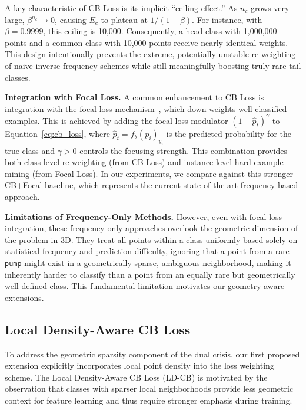 \documentclass[preprint,12pt]{elsarticle}
\begin{document}
A key characteristic of CB Loss is its implicit ``ceiling effect.'' As \(n_c\) grows very large, \(\beta^{n_c} \to 0\), causing \(E_c\) to plateau at \(1/(1-\beta)\). For instance, with \(\beta=0.9999\), this ceiling is 10,000. Consequently, a head class with 1,000,000 points and a common class with 10,000 points receive nearly identical weights. This design intentionally prevents the extreme, potentially unstable re-weighting of naive inverse-frequency schemes while still meaningfully boosting truly rare tail classes.

\textbf{Integration with Focal Loss.} A common enhancement to CB Loss is integration with the focal loss mechanism~\cite{lin2017focal}, which down-weights well-classified examples. This is achieved by adding the focal loss modulator \((1-\hat{p}_t)^\gamma\) to Equation~\eqref{eq:cb_loss}, where \(\hat{p}_t = f_\theta(p_i)_{y_i}\) is the predicted probability for the true class and \(\gamma > 0\) controls the focusing strength. This combination provides both class-level re-weighting (from CB Loss) and instance-level hard example mining (from Focal Loss). In our experiments, we compare against this stronger CB+Focal baseline, which represents the current state-of-the-art frequency-based approach.

\textbf{Limitations of Frequency-Only Methods.} However, even with focal loss integration, these frequency-only approaches overlook the geometric dimension of the problem in 3D. They treat all points within a class uniformly based solely on statistical frequency and prediction difficulty, ignoring that a point from a rare \texttt{pump} might exist in a geometrically sparse, ambiguous neighborhood, making it inherently harder to classify than a point from an equally rare but geometrically well-defined class. This fundamental limitation motivates our geometry-aware extensions.

\subsection{Local Density-Aware CB Loss}
\label{sec:ld_cb_loss}
To address the geometric sparsity component of the dual crisis, our first proposed extension explicitly incorporates local point density into the loss weighting scheme. The Local Density-Aware CB Loss (LD-CB) is motivated by the observation that classes with sparser local neighborhoods provide less geometric context for feature learning and thus require stronger emphasis during training.
\end{document}
